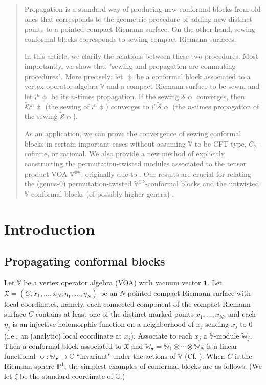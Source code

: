 \documentclass[12pt,a4paper,notitlepage]{article}
\theoremstyle{definition}
\theoremstyle{plain}
\newcommand{\fk}{\mathfrak}
\newcommand{\mc}{\mathcal}
\newcommand{\wtd}{\widetilde}
\newcommand{\id}{\mathbf{1}}
\newcommand{\blt}{\bullet}
\newcommand{\Vbb}{\mathbb V}
\newcommand{\Wbb}{\mathbb W}
\newcommand{\Cbb}{\mathbb C}
\newcommand{\Pbb}{\mathbb P}
\numberwithin{equation}{section}
\begin{document}
\begin{abstract}
Propagation is a standard way of producing new conformal blocks from old ones that corresponds to the geometric procedure of adding new  distinct points to a pointed compact Riemann surface. On the other hand, sewing conformal blocks corresponds to sewing compact Riemann surfaces. 

In this article, we clarify the relations between these two procedures. Most importantly, we show that "sewing and propagation are commuting procedures". More precisely: let $\upphi$ be a conformal block associated to a vertex operator algebra $\Vbb$ and a compact Riemann surface to be sewn, and let $\wr^n\upphi$ be its $n$-times propagation. If the  sewing $\wtd{\mc S}\upphi$  converges, then $\wtd{\mc S}\wr^n\upphi$ (the sewing of $\wr^n\upphi$)  converges to $\wr^n\wtd{\mc S}\upphi$ (the $n$-times propagation of the sewing $\wtd{\mc S}\upphi$). 

As an application, we can prove the convergence of sewing conformal blocks in certain important cases without assuming $\Vbb$ to be CFT-type, $C_2$-cofinite, or rational. We also provide a new method of explicitly constructing the permutation-twisted modules associated to the  tensor product VOA $\Vbb^{\otimes k}$, originally due to \cite{BDM02}. Our results are crucial for relating the (genus-$0$) permutation-twisted $\Vbb^{\otimes k}$-conformal blocks and the untwisted $\Vbb$-conformal blocks (of possibly higher genera)  \cite{Gui21}.
\end{abstract}








\section{Introduction}

\subsection*{Propagating conformal blocks}


Let $\Vbb$ be a vertex operator algebra (VOA) with vacuum vector $\id$. Let $\fk X=(C;x_1,\dots,x_N;\eta_1,\dots,\eta_N)$ be an $N$-pointed compact Riemann surface with local coordinates, namely, each connected component of the compact Riemann surface $C$ contains at least one of the distinct marked points $x_1,\dots,x_N$, and each $\eta_j$ is an injective holomorphic function on a neighborhood of $x_j$ sending $x_j$ to $0$ (i.e., an (analytic) local coordinate at $x_j$). Associate to each $x_j$ a $\Vbb$-module $\Wbb_j$. Then a conformal block  associated to $\fk X$ and $\Wbb_\blt=\Wbb_1\otimes\cdots\otimes\Wbb_N$ is a linear functional $\upphi:\Wbb_\blt\rightarrow\Cbb$ ``invariant" under the actions of $\Vbb$ (Cf. \cite{Zhu94,FB04,DGT19a}). When $C$ is the Riemann sphere $\Pbb^1$, the simplest examples of conformal blocks are as follows. (We let $\zeta$ be the standard coordinate of $\Cbb$.)
\end{document}
